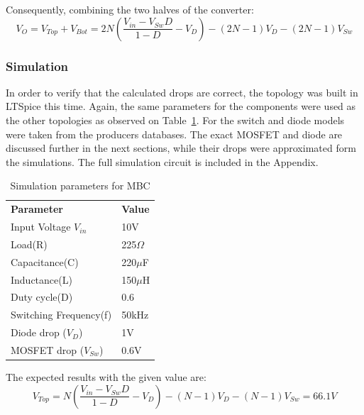 Consequently, combining the two halves of the converter: 
\begin{equation}
	V_{O}=V_{Top}+V_{Bot}=2N( \frac{V_{in}-V_{Sw}D}{1-D}-V_D)-(2N-1)V_D-(2N-1)V_{Sw}
	\label{eq:DROPS_2INX_FINAL}
\end{equation}

\subsubsection{Simulation}

In order to verify that the calculated drops are correct,
the topology was built in LTSpice this time. 
Again, the same parameters for the components were used as the other topologies as observed on Table~\ref{tab:MBC_2Nx}. 
For the switch and diode models were taken from the producers databases. 
The exact MOSFET and diode are discussed further in the next sections, while their drops were approximated form the simulations.
The full simulation circuit is included in the Appendix. 

\begin{table}[H]
\begin{center}
\caption {Simulation parameters for MBC} \label{tab:MBC_2Nx} 
\begin{tabular}{|l|l|}
\cline{1-2}
\textbf{Parameter} & \textbf{Value}  \\ \cline{1-2}
Input Voltage $V_{in}$          &      10V   \\ \cline{1-2}
Load(R)   & 225$\Omega$           \\ \cline{1-2}
Capacitance(C)          &       220$\mu$F     \\ \cline{1-2}
Inductance(L)          &      150$\mu$H      \\ \cline{1-2}
Duty cycle(D)          &     0.6       \\ \cline{1-2}
Switching Frequency(f)          &      50kHz      \\ \cline{1-2}
Diode drop ($V_D$)          &     1V       \\ \cline{1-2}
MOSFET drop ($V_{Sw}$)          &     0.6V       \\ \cline{1-2}
\end{tabular}
\end{center}
\end{table}

The expected results with the given value are: 
\begin{equation}
	V_{Top}= N( \frac{V_{in}-V_{Sw}D}{1-D}-V_D)-(N-1)V_D-(N-1)V_{Sw}= 66.1V
	\label{eq:DROPS_NX_SIM}
\end{equation}

